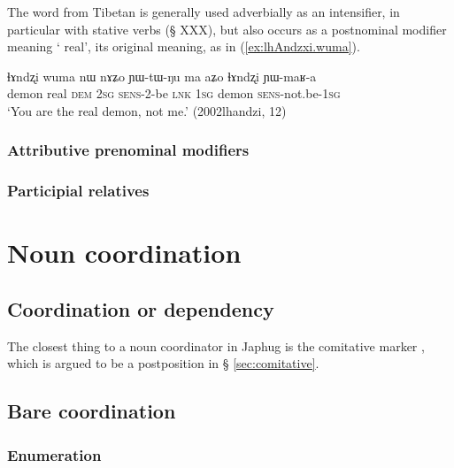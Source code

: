 The word  from Tibetan  is generally used adverbially as an intensifier, in particular with stative verbs (§ XXX), but also occurs as a postnominal modifier meaning ` real', its original meaning, as in (\ref{ex:lhAndzxi.wuma}).

\begin{exe}
\ex \label{ex:lhAndzxi.wuma}
\gll ɬɤndʐi wuma nɯ nɤʑo ɲɯ-tɯ-ŋu ma aʑo ɬɤndʐi ɲɯ-maʁ-a \\
demon real \textsc{dem} \textsc{2sg} \textsc{sens}-2-be \textsc{lnk} \textsc{1sg} demon \textsc{sens}-not.be-\textsc{1sg} \\
\glt `You are the real demon, not me.' (2002lhandzi, 12)
\end{exe}


\subsubsection{Attributive prenominal modifiers}

\subsubsection{Participial relatives}

 \section{Noun coordination}
\subsection{Coordination or dependency} \label{sec:coordinator}
The closest thing to a noun coordinator in Japhug is the comitative marker , which is argued to be a postposition in § \ref{sec:comitative}.

\subsection{Bare coordination}

\subsubsection{Enumeration} \label{sec:noun.enumeration}

